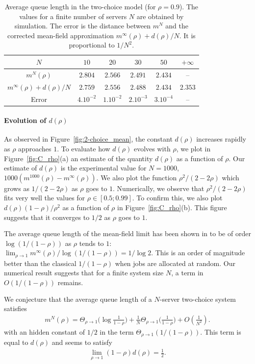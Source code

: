 \documentclass[sigconf]{acmart}
\newcommand\p[1]{\left(#1\right)}
\begin{document}
\begin{table}[t]
  \centering
  \begin{tabular}{@{}|@{}c@{}|c|c|c|c|c|}
    \hline
    $N$
    &$  10$  &$  20$  &$  30$  &$  50$ & $+\infty$  \\\hline $m^N(\rho)$
    &$2.804$ &$2.566$ &$2.491$ &$2.434$&-- \\\hline $m^\infty(\rho){+}d(\rho)/N$ 
    &$2.759$ &$2.556$ &$2.488$ &$2.434$&$2.353$ \\\hline Error
    &$4. 10^{-2}$&$1 . 10^{-2}$&$2 .10^{-3}$&$3 . 10^{-4}$&--\\
    \hline
  \end{tabular}
  \caption{Average queue length in the two-choice model (for
    $\rho=0.9$). The values for a finite number of servers  $N$ are obtained by
    simulation. The error is the distance between $m^N$ and the
    corrected mean-field approximation $m^\infty(\rho)+d(\rho)/N$. It is
    proportional to $1/N^2$.}
  \label{tab:2}
\end{table}



\paragraph*{Evolution of $d(\rho)$}
As observed in Figure~\ref{fig:2-choice_mean}, the constant $d(\rho)$
increases rapidly as $\rho$ approaches $1$.  To evaluate how $d(\rho)$
evolves with $\rho$, we plot in Figure~\ref{fig:C_rho}(a) an estimate
of the quantity $d(\rho)$ as a function of $\rho$. Our estimate of
$d(\rho)$ is the experimental value for $N=1000$,
$1000(m^{1000}(\rho)-m^\infty(\rho))$.  We also plot the function
$\rho^2/(2-2\rho)$ which grows as $1/(2-2\rho)$ as $\rho$ goes to $1$.
Numerically, we observe that $\rho^2/(2-2\rho)$ fits very well the
values for $\rho\in[0.5;0.99]$. To confirm this, we also plot
$d(\rho)(1-\rho)/\rho^2$ as a function of $\rho$ in
Figure~\ref{fig:C_rho}(b). This figure suggests that it converges to
$1/2$ as $\rho$ goes to $1$.

The average queue length of the mean-field limit has been shown in
\cite{mitzenmacher1996power} to be of order $\log (1/(1-\rho))$ as
$\rho$ tends to $1$:
$\lim_{\rho\to1}m^\infty(\rho) / \log(1/(1-\rho)) = 1/\log2$.
This is an order of magnitude better than the classical $1/(1-\rho)$
when jobs are allocated at random. Our numerical result suggests that
for a finite system size $N$, a term in $O(1/(1-\rho))$ remains.

We conjecture that the average queue length of a $N$-server two-choice
system satisfies 
\begin{align*}
  m^N(\rho) = \Theta_{\rho\to1}\Big(\log\frac1{1-\rho}\Big)
  + \frac{1}{N}\Theta_{\rho\to1}\Big(\frac{1}{1-\rho}\Big) +
  O\p{\frac1{N^2}}. 
\end{align*}
with an hidden constant of $1/2$ in the term
$\Theta_{\rho\to1}(1/(1-\rho))$. This term is equal to $d(\rho)$ and
seems to satisfy
\begin{align*}
  \lim_{\rho\to1}  (1-\rho) d(\rho)  = \frac12.
\end{align*}
\end{document}
